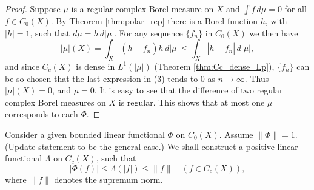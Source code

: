 \begin{proof}
  Suppose $\mu$ is a regular complex Borel measure on $X$ and $\int f \, d\mu = 0$ for all $f \in C_0(X)$.
  By Theorem \ref{thm:polar_rep} there is a Borel function $h$, with $|h| = 1$, such that $d\mu = h \, d|\mu|$.
  For any sequence $\{f_n\}$ in $C_0(X)$ we then have
  \begin{equation}
    |\mu|(X) = \int_X (\bar{h} - f_n)h \, d|\mu| \leq \int_X |\bar{h} - f_n| \, d|\mu|, \tag{3}
  \end{equation}
  and since $C_c(X)$ is dense in $L^1(|\mu|)$ (Theorem \ref{thm:Cc_dense_Lp}), $\{f_n\}$ can be so chosen that the last expression in (3) tends to 0 as $n \to \infty$.
  Thus $|\mu|(X) = 0$, and $\mu = 0$.
  It is easy to see that the difference of two regular complex Borel measures on $X$ is regular.
  This shows that at most one $\mu$ corresponds to each $\Phi$.
\end{proof}


\begin{lemma}
  \label{lem:exists_pos_lin_func}
  Consider a given bounded linear functional $\Phi$ on $C_0(X)$.
  Assume $\|\Phi\| = 1$. (Update statement to be the general case.)
  We shall construct a positive linear functional $\Lambda$ on $C_c(X)$, such that
  \begin{equation}
    |\Phi(f)| \leq \Lambda(|f|) \leq \|f\| \quad (f \in C_c(X)), \tag{4}
  \end{equation}
  where $\|f\|$ denotes the supremum norm.
\end{lemma}

